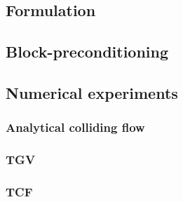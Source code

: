 \documentclass[compress,11 pt,t]{beamer}
\begin{document}
\subsection{Formulation}


\subsection{Block-preconditioning}


\subsection{Numerical experiments}


\subsubsection{Analytical colliding flow}


\subsubsection{TGV}


\subsubsection{TCF}


\end{document}
